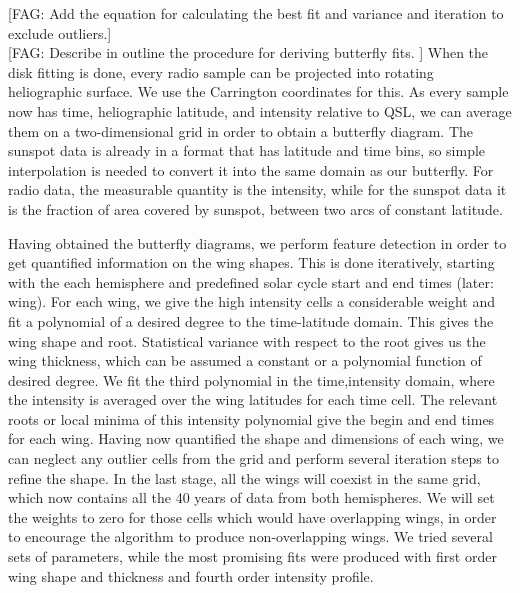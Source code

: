 \documentclass{aa}
\newcommand{\fag}[1]{\textcolor{midpurple}{[FAG: #1]}} %
\begin{document}
  \fag{Add the equation for calculating the best fit and variance and iteration to exclude outliers.}\\
  \fag{Describe in outline the procedure for deriving butterfly fits.
  }
When the disk fitting is done, every radio sample can be projected into rotating heliographic surface. We use the 
Carrington coordinates for this. As every sample now has time, heliographic latitude, and intensity relative to QSL, we 
can average them on a two-dimensional grid in order to obtain a butterfly diagram. The sunspot data is already in a 
format that has latitude and time bins, so simple interpolation is needed to convert it into the same domain as our 
butterfly. For radio data, the measurable quantity is the intensity, while for the sunspot data it is the fraction of 
area covered by sunspot, between two arcs of constant latitude.

Having obtained the butterfly 
diagrams, we 
perform feature detection in order to get quantified information on the wing 
shapes. 
This is done iteratively, starting with the each hemisphere and predefined solar cycle start and end times 
(later: wing). For each wing, we give the high intensity cells a considerable weight and fit a polynomial of a desired 
degree to the time-latitude domain. This gives the wing shape and root. Statistical variance with respect to the root 
gives us the wing thickness, which can be assumed a constant or a polynomial function of desired degree. We fit the 
third polynomial in the time,intensity domain, where the intensity is averaged over the wing latitudes for each time 
cell. The relevant roots or local minima of this intensity polynomial give the begin and end times for each wing. Having 
now quantified the shape and dimensions of each wing, we can neglect any outlier cells from the grid and perform several 
iteration steps to refine the shape. In the last stage, all the wings will coexist in the same grid, which now contains 
all the 40 years of data from both hemispheres. We will set the weights to zero for those cells which would have 
overlapping wings, in order to encourage the algorithm to produce non-overlapping wings. We tried several sets of 
parameters, while the most promising fits were produced with first order wing shape and thickness and fourth order 
intensity profile.
\end{document}
